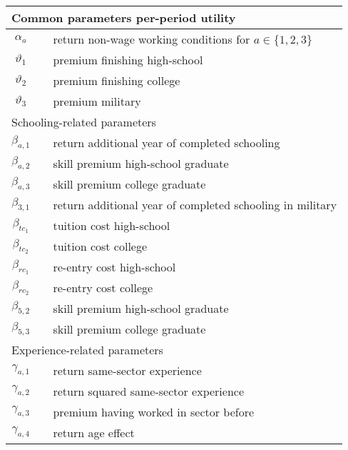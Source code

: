 \begin{ThreePartTable}
\begin{longtable}{@{}cll@{}}
\midrule
\multicolumn{3}{l}{Common parameters per-period utility}																			 \\ \midrule 
$\alpha_a$           &  & return non-wage working conditions for $a \in \{1 ,2 ,3 \}$		   \\
$\vartheta_1$        &  & premium finishing high-school                 								    \\
$\vartheta_2$        &  & premium finishing college															    \\
$\vartheta_3$        &  & premium military                              											  \\[7.5pt] \midrule 
\multicolumn{3}{l}{Schooling-related parameters}															   \\ \midrule
$\beta_{a,1}$        &  & return additional year of completed schooling 							   \\
$\beta_{a,2}$        &  & skill premium high-school graduate            									\\
$\beta_{a,3}$        &  & skill premium college graduate													   	\\
$\beta_{3,1}$        &  & return additional year of completed schooling in military					\\
$\beta_{tc_1}$       &  & tuition cost high-school                      											\\
$\beta_{tc_2}$       &  & tuition cost college                          												\\
$\beta_{rc_1}$       &  & re-entry cost high-school                     										   \\
$\beta_{rc_2}$       &  & re-entry cost college                        												   \\
$\beta_{5,2}$        &  & skill premium high-school graduate            									\\
$\beta_{5,3}$        &  & skill premium college graduate                									     \\ [7.5pt] \midrule
\multicolumn{3}{l}{Experience-related parameters}           													 \\
\midrule 
$\gamma_{a,1}$       &  & return same-sector experience                 									 \\
$\gamma_{a,2}$       &  & return squared same-sector experience         								\\
$\gamma_{a,3}$       &  & premium having worked in sector before        							   \\
$\gamma_{a,4}$       &  & return age effect                             											     \\

\end{longtable}
\end{ThreePartTable}
